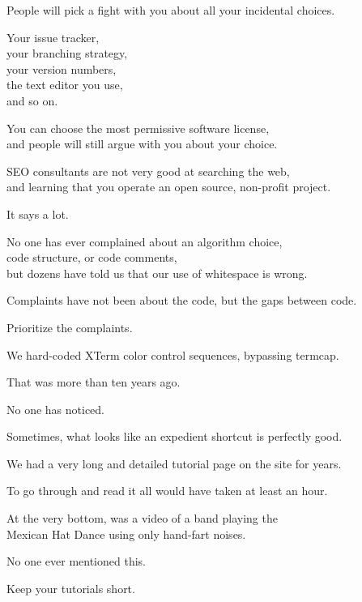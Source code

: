 \documentclass[t,handout,aspectratio=169]{beamer}
\begin{document}
\begin{frame}[fragile]%
    \vfill
    People will pick a fight with you about all your incidental choices. \pause

    Your issue tracker, \\
    your branching strategy, \\
    your version numbers, \\
    the text editor you use, \\
    and so on.
\end{frame}

\begin{frame}[fragile]%
    \vfill
    You can choose the most permissive software license, \\
    and people will still argue with you about your choice.
\end{frame}

\begin{frame}[fragile]%
    \vfill
    SEO consultants are not very good at searching the web, \pause \\
    and learning that you operate an open source, non-profit project. \pause

    It says a lot.
\end{frame}

\begin{frame}[fragile]%
    \vfill
    No one has ever complained about an algorithm choice, \\
    code structure, or code comments, \pause \\
    but dozens have told us that our use of whitespace is wrong. \pause

    Complaints have not been about the code, but the gaps between code. \pause

    Prioritize the complaints.
\end{frame}

\begin{frame}[fragile]%
    \vfill
    We hard-coded XTerm color control sequences, bypassing termcap.

    That was more than ten years ago.

    No one has noticed. \pause

    Sometimes, what looks like an expedient shortcut is perfectly good.
\end{frame}

\begin{frame}[fragile]%
    \vfill
    We had a very long and detailed tutorial page on the site for years.

    To go through and read it all would have taken at least an hour. \pause

    At the very bottom, was a video of a band playing the \\
    Mexican Hat Dance using only hand-fart noises. \pause

    No one ever mentioned this.

    Keep your tutorials short.
\end{frame}
\end{document}
